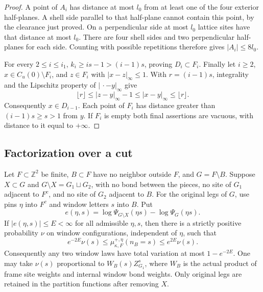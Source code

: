 \begin{proof}
A point of \(A_i\) has distance at most \(l_0\) from at least
one of the four exterior half-planes.  A shell side parallel to
that half-plane cannot contain this point, by the clearance just
proved.  On a perpendicular side at most \(l_0\) lattice sites
have that distance at most \(l_0\).  There are four shell sides
and two perpendicular half-planes for each side.  Counting with
possible repetitions therefore gives \(|A_i|\le8l_0\).

For every \(2\le i\le i_1\),
\(k_i\ge is-1>(i-1)s\), proving \(D_i\subset F_i\).
Finally let \(i\ge2\), \(x\in C_u(0)\setminus F_i\), and
\(z\in F_i\) with \(|x-z|_\infty\le1\).  With \(r=(i-1)s\),
integrality and the Lipschitz property of \(|\,\cdot-y|_\infty\)
give
\[
 \lfloor r\rfloor\le |z-y|_\infty-1
       \le |x-y|_\infty\le\lfloor r\rfloor.
\]
Consequently \(x\in D_{i-1}\).  Each point of \(F_i\) has
distance greater than \((i-1)s\ge s>1\) from \(y\).
If \(F_i\) is empty both final assertions are vacuous, with
distance to it equal to \(+\infty\).
\end{proof}

\subsection{Factorization over a cut}

\begin{lemma}\label{l:cut}
Let \(F\subset\mathbb Z^2\) be finite, \(B\subset F\) have no
neighbor outside \(F\), and \(G=F\setminus B\).
Suppose \(X\subset G\) and \(G\setminus X=G_1\sqcup G_2\), with
no bond between the pieces, no site of \(G_1\) adjacent to \(F^c\),
and no site of \(G_2\) adjacent to \(B\).
For the original legs of \(G\), use pins \(\eta\) into \(F^c\)
and window letters \(s\) into \(B\). Put
\[
 e(\eta,s)=\log\Psi_{G\setminus X}(\eta s)-\log\Psi_G(\eta s).
\]
If \(|e(\eta,s)|\le E<\infty\) for all admissible \(\eta,s\),
then there is a strictly positive probability \(\nu\) on window
configurations, independent of \(\eta\), such that
\[
 e^{-2E}\nu(s)\le\mu^{+,\eta}_{\kappa,F}(n_B=s)
                         \le e^{2E}\nu(s).
\]
Consequently any two window laws have total variation at most
\(1-e^{-2E}\).
One may take \(\nu(s)\) proportional to \(W_B(s)Z_{G_1}^{s}\),
where \(W_B\) is the actual product of frame site weights and
internal window bond weights. Only original legs are retained in
the partition functions after removing \(X\).
\end{lemma}

